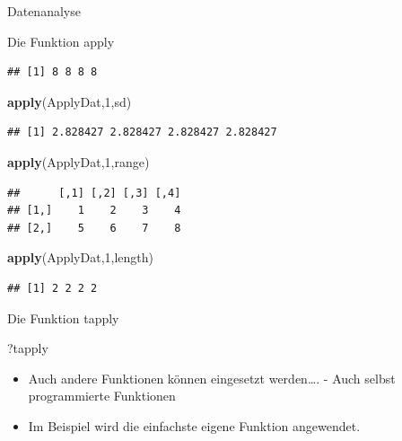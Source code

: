 \documentclass[ignorenonframetext,]{beamer}
\newenvironment{Shaded}{}{}
\newcommand{\KeywordTok}[1]{\textcolor[rgb]{0.00,0.44,0.13}{\textbf{{#1}}}}
\newcommand{\DecValTok}[1]{\textcolor[rgb]{0.25,0.63,0.44}{{#1}}}
\newcommand{\NormalTok}[1]{{#1}}
\providecommand{\tightlist}{%
\setlength{\itemsep}{0pt}\setlength{\parskip}{0pt}}
\begin{document}
\begin{frame}[fragile]{Datenanalyse}
\begin{block}{Die Funktion apply}
\begin{verbatim}
## [1] 8 8 8 8
\end{verbatim}

\begin{Shaded}
\begin{Highlighting}[]
\KeywordTok{apply}\NormalTok{(ApplyDat,}\DecValTok{1}\NormalTok{,sd)}
\end{Highlighting}
\end{Shaded}

\begin{verbatim}
## [1] 2.828427 2.828427 2.828427 2.828427
\end{verbatim}

\begin{Shaded}
\begin{Highlighting}[]
\KeywordTok{apply}\NormalTok{(ApplyDat,}\DecValTok{1}\NormalTok{,range)}
\end{Highlighting}
\end{Shaded}

\begin{verbatim}
##      [,1] [,2] [,3] [,4]
## [1,]    1    2    3    4
## [2,]    5    6    7    8
\end{verbatim}

\begin{Shaded}
\begin{Highlighting}[]
\KeywordTok{apply}\NormalTok{(ApplyDat,}\DecValTok{1}\NormalTok{,length)}
\end{Highlighting}
\end{Shaded}

\begin{verbatim}
## [1] 2 2 2 2
\end{verbatim}

\end{block}

\begin{block}{Die Funktion tapply}

\begin{Shaded}
\begin{Highlighting}[]
\NormalTok{?tapply}
\end{Highlighting}
\end{Shaded}

\begin{itemize}
\tightlist
\item
  Auch andere Funktionen können eingesetzt werden\ldots{}. - Auch selbst
  programmierte Funktionen
\item
  Im Beispiel wird die einfachste eigene Funktion angewendet.
\end{itemize}


\end{block}
\end{frame}
\end{document}
